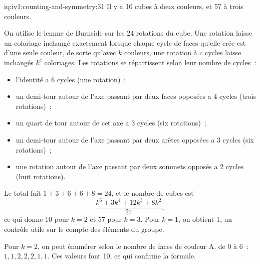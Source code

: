 \begin{solution}{iq:iv1:counting-and-symmetry:31}
Il y a 10 cubes à deux couleurs, et 57 à trois couleurs.

On utilise le lemme de Burnside sur les 24 rotations du cube. Une rotation laisse un coloriage inchangé exactement lorsque chaque cycle de faces qu'elle crée est d'une seule couleur, de sorte qu'avec $k$ couleurs, une rotation à $c$ cycles laisse inchangés $k^c$ coloriages. Les rotations se répartissent selon leur nombre de cycles~:
\begin{itemize}
\item l'identité a 6 cycles (une rotation)~;
\item un demi-tour autour de l'axe passant par deux faces opposées a 4 cycles (trois rotations)~;
\item un quart de tour autour de cet axe a 3 cycles (six rotations)~;
\item un demi-tour autour de l'axe passant par deux arêtes opposées a 3 cycles (six rotations)~;
\item une rotation autour de l'axe passant par deux sommets opposés a 2 cycles (huit rotations).
\end{itemize}
Le total fait $1 + 3 + 6 + 6 + 8 = 24$, et le nombre de cubes est
\[
\frac{k^6 + 3k^4 + 12k^3 + 8k^2}{24},
\]
ce qui donne 10 pour $k = 2$ et 57 pour $k = 3$. Pour $k = 1$, on obtient 1, un contrôle utile sur le compte des éléments du groupe.

Pour $k = 2$, on peut énumérer selon le nombre de faces de couleur A, de 0 à 6~: $1, 1, 2, 2, 2, 1, 1$. Ces valeurs font 10, ce qui confirme la formule.

\end{solution}

